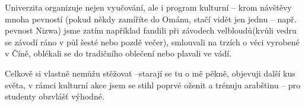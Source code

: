 Univerzita organizuje nejen vyučování, ale i program kulturní – krom návštěvy mnoha pevností (pokud někdy zamíříte do Ománu, stačí vidět jen jednu – např. pevnost Nizwa) jsme zatím například fandili při závodech velbloudů(kvůli vedru se závodí ráno v půl šesté nebo pozdě večer), smlouvali na trzích o věci vyrobené v Číně, oblékali se do tradičního oblečení nebo plavali ve vádí. 

Celkově si vlastně nemůžu stěžovat –starají se tu o mě pěkně, objevuji další kus světa, v rámci kulturní akce jsem se stihl poprvé oženit a trénuju arabštinu – pro studenty obzvlášť výhodné. 

